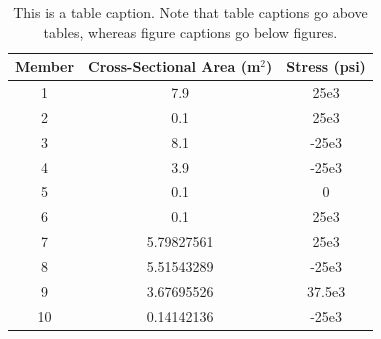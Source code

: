 \documentclass{article}
\begin{document}
\begin{table}[htb]
	\centering
	\caption{This is a table caption.  Note that table captions go above tables, whereas figure captions go below figures.}
	\label{tab:mytable}
	\begin{tabular}{c|c|c}
		\toprule
		Member & Cross-Sectional Area (m$^2$)& Stress (psi) \\
		\midrule
		1 & 7.9 & 25e3 \\
		2 & 0.1 & 25e3 \\
		3 & 8.1 & -25e3 \\
		4 & 3.9 & -25e3 \\
		5 & 0.1 & 0 \\
		6 & 0.1 & 25e3 \\
		7 & 5.79827561 & 25e3 \\
		8 & 5.51543289 & -25e3\\
		9 & 3.67695526 & 37.5e3 \\
		10 & 0.14142136 & -25e3 \\
		\bottomrule
	\end{tabular}
\end{table}




\end{document}
